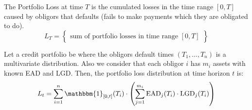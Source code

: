 \documentclass[11pt,fleqn]{book} %
\begin{document}

\begin{definition}
	The Portfolio Loss at time $T$ is the cumulated losses in the time 
	range $[0,T]$ caused by obligors that defaults (fails to make 
	payments which they are obligated to do).
	\begin{displaymath}
		L_T = \left\{
		\begin{array}{c}
			\text{sum of portfolio losses in time range $[0,T]$}
		\end{array}
		\right\}
	\end{displaymath}
\end{definition}

Let a credit portfolio be where the obligors default times $(T_1,\dots,T_n)$ 
is a multivariate distribution. Also we consider that each obligor $i$ has 
$m_i$ assets with known EAD and LGD\@. Then, the portfolio loss distribution 
at time horizon $t$ is:
\begin{displaymath}
	L_t = \displaystyle \sum_{i=1}^n \mathbbm{1}_{[0,t]}(T_i) \cdot 
	\left( 
	\sum_{j=1}^{m_i} \text{EAD}_j(T_i) \cdot \text{LGD}_j(T_i)
	\right)
\end{displaymath}
\end{document}
